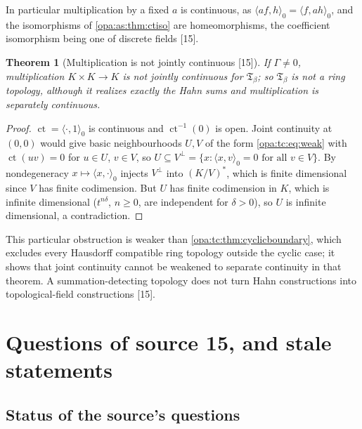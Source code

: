 \documentclass[11pt,oneside]{article}
\numberwithin{equation}{section}
\newtheorem{theorem}{Theorem}[section]
\theoremstyle{definition}
\theoremstyle{remark}
\newcommand{\ct}{\operatorname{ct}}
\newcommand{\src}[1]{\textup{\textsf{\small[#1]}}}
\newcommand{\pairing}[2]{\langle #1,#2\rangle_0}
\begin{document}
In particular multiplication by a fixed $a$ is continuous, as $\pairing{af}h=\pairing f{ah}$, and the
isomorphisms of \cref{opa:as:thm:ctiso} are homeomorphisms, the coefficient isomorphism being one of
discrete fields \src{15}.

\begin{theorem}[Multiplication is not jointly continuous \src{15}]\label{opa:tc:thm:notjoint}
If $\Gamma\ne0$, multiplication $K\times K\to K$ is not jointly continuous for $\mathfrak T_\beta$; so $\mathfrak T_\beta$ is
not a ring topology, although it realizes exactly the Hahn sums and multiplication is separately
continuous.
\end{theorem}
\begin{proof}
$\ct=\pairing\cdot1$ is continuous and $\ct^{-1}(0)$ is open. Joint continuity at $(0,0)$ would give basic
neighbourhoods $U,V$ of the form \eqref{opa:tc:eq:weak} with $\ct(uv)=0$ for $u\in U$, $v\in V$, so
$U\subseteq V^\perp=\{x:\pairing xv=0\text{ for all }v\in V\}$. By nondegeneracy $x\mapsto\pairing x\cdot$ injects
$V^\perp$ into $(K/V)^*$, which is finite dimensional since $V$ has finite codimension. But $U$ has finite
codimension in $K$, which is infinite dimensional ($t^{n\delta}$, $n\ge0$, are independent for $\delta>0$), so $U$
is infinite dimensional, a contradiction.
\end{proof}

This particular obstruction is weaker than \cref{opa:tc:thm:cyclicboundary}, which excludes every Hausdorff
compatible ring topology outside the cyclic case; it shows that joint continuity cannot be weakened to
separate continuity in that theorem. A summation-detecting topology does not turn Hahn constructions into
topological-field constructions \src{15}.

\section{Questions of source 15, and stale statements}\label{opa:tc:sec:questions}

\subsection{Status of the source's questions}\label{opa:tc:sub:status}
\end{document}
